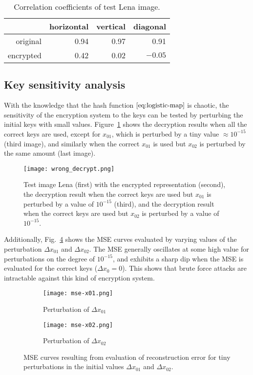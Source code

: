 \begin{table}
	\centering
	\caption{Correlation coefficients of test Lena image.}
	\label{tab:correlation}
	\begin{tabular}{rrrr}
		\toprule
		 & horizontal & vertical & diagonal \\
		 \midrule
		 original & 0.94 & 0.97 & 0.91 \\
		 encrypted & 0.42 & 0.02 & $-0.05$ \\
		 \bottomrule
	\end{tabular}
\end{table}


\subsection{Key sensitivity analysis}
\label{ssec:image-encrypt-keysensitivity}
With the knowledge that the hash function $\eqref{eq:logistic-map}$ is chaotic, the sensitivity of the encryption system to the keys can be tested by perturbing the initial keys with small values. Figure~\ref{fig:wrong-decryption} shows the decryption results when all the correct keys are used, except for $x_{01}$, which is perturbed by a tiny value $\approx 10^{-15}$ (third image), and similarly when the correct $x_{01}$ is used but $x_{02}$ is perturbed by the same amount (last image).

\begin{figure}[htb]
	\texttt{[image: wrong\_decrypt.png]}
	\caption{Test image Lena (first) with the encrypted representation (second), the decryption result when the correct keys are used but $x_{01}$ is perturbed by a value of $10^{-15}$ (third), and the decryption result when the correct keys are used but $x_{02}$ is perturbed by a value of $10^{-15}$.}
	\label{fig:wrong-decryption}
\end{figure}

Additionally, Fig.~\ref{fig:perturb-mse} shows the MSE curves evaluated by varying values of the perturbation $\Delta x_{01}$ and $\Delta x_{02}$. The MSE generally oscillates at some high value for perturbations on the degree of $10^{-15}$, and exhibits a sharp dip when the MSE is evaluated for the correct keys ($\Delta x_0 = 0$). This shows that brute force attacks are intractable against this kind of encryption system.

\begin{figure}[htb]
	\centering
	\begin{subfigure}{0.49\textwidth}
		\centering
		\texttt{[image: mse-x01.png]}
		\caption{Perturbation of $\Delta x_{01}$}
		\label{fig:perturb-mse-x01}
	\end{subfigure} 
	\begin{subfigure}{0.49\textwidth}
		\centering
		\texttt{[image: mse-x02.png]}
		\caption{Perturbation of $\Delta x_{02}$}
		\label{fig:perturb-mse-x02}
	\end{subfigure}
	\caption{MSE curves resulting from evaluation of reconstruction error for tiny perturbations in the initial values $\Delta x_{01}$ and $\Delta x_{02}$.}
	\label{fig:perturb-mse}
\end{figure}